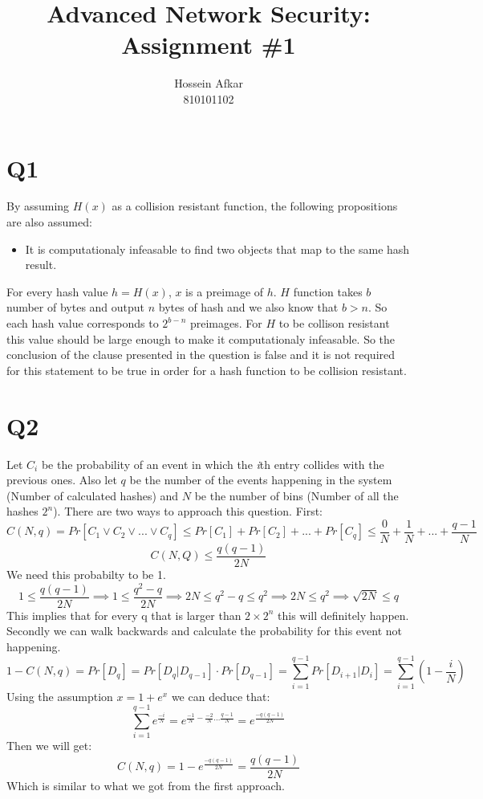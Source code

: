 \documentclass[a4paper, 11pt]{article}
\title{Advanced Network Security: Assignment \#1}
\author{Hossein Afkar \\ 810101102}
\begin{document}
\maketitle
\section{Q1}
By assuming $H(x)$ as a collision resistant function, the following
propositions are also assumed:
\begin{itemize}
    \item It is computationaly infeasable to find two objects that map to the
        same hash result.
\end{itemize}
For every hash value $h = H(x)$, $x$ is a preimage of $h$.
$H$ function takes $b$ number of bytes and output $n$ bytes of hash and we
also know that $b > n$. So each hash value corresponds to $2^{b-n}$ preimages.
For $H$ to be collison resistant this value should be large enough to make it
computationaly infeasable. So the conclusion of the clause presented in the
question is false and it is not required for this statement to be true in
order for a hash function to be collision resistant.
\section{Q2}
Let $C_i$ be the probability of an event in which the \textit{i}th entry
collides with the previous ones. Also let $q$ be the number of the events
happening in the system (Number of calculated hashes) and $N$ be the number of
bins (Number of all the hashes $2^n$). There are two ways to approach this
question. First:
\begin{equation}
    C(N,q) = Pr[C_1 \vee C_2 \vee ... \vee C_q] \le Pr[C_1] + Pr[C_2] + ... + 
    Pr[C_q] \le \frac{0}{N} + \frac{1}{N} + ... + \frac{q-1}{N}
\end{equation}
\begin{equation}
    C(N,Q) \le \frac{q(q-1)}{2N}
\end{equation}
We need this probabilty to be 1.
\begin{equation}
    1 \le \frac{q(q-1)}{2N} \implies 1 \le \frac{q^2 - q}{2N} \implies 2N \le
    q^2 - q \le q^2 \implies 2N \le q^2 \implies \sqrt{2N} \le q
\end{equation}
This implies that for every q that is larger than $2 \times 2^n$ this will
definitely happen.
Secondly we can walk backwards and calculate the probability for this event
not happening.
\begin{equation}
    1 - C(N,q) = Pr[D_q] = Pr[D_q|D_{q-1}] \cdot Pr[D_{q-1}] = \sum_{i=1}^{q-1}Pr[D_{i+1}|D_i] = \sum_{i=1}^{q-1}(1-\frac{i}{N})
\end{equation}
Using the assumption $x = 1 + e^x$ we can deduce that:
\begin{equation}
    \sum_{i=1}^{q-1}e^{\frac{-i}{N}} = e^{\frac{-1}{N} - \frac{-2}{N} ...
    \frac{q-1}{N}} = e^{\frac{-q(q-1)}{2N}}
\end{equation}
Then we will get:
\begin{equation}
    C(N,q) = 1 - e^{\frac{-q(q-1)}{2N}} = \frac{q(q-1)}{2N}
\end{equation}
Which is similar to what we got from the first approach.
\end{document}
